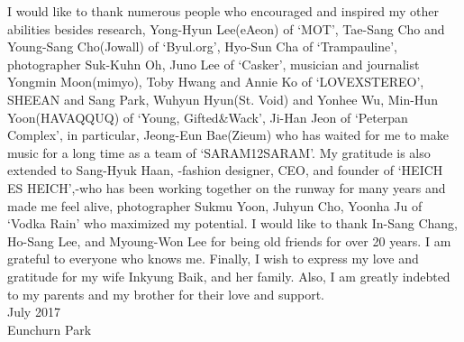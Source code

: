 I would like to thank numerous people who encouraged and inspired my other abilities besides research, Yong-Hyun Lee(eAeon) of `MOT', Tae-Sang Cho and Young-Sang Cho(Jowall) of `Byul.org', Hyo-Sun Cha of `Trampauline', photographer Suk-Kuhn Oh, Juno Lee of `Casker', musician and journalist Yongmin Moon(mimyo), Toby Hwang and Annie Ko of `LOVEXSTEREO', SHEEAN and Sang Park, Wuhyun Hyun(St. Void) and Yonhee Wu, Min-Hun Yoon(HAVAQQUQ) of `Young, Gifted\&Wack', Ji-Han Jeon of `Peterpan Complex', in particular, Jeong-Eun Bae(Zieum) who has waited for me to make music for a long time as a team of `SARAM12SARAM'. My gratitude is also extended to Sang-Hyuk Haan, -fashion designer, CEO, and founder of `HEICH ES HEICH',-who has been working together on the runway for many years and made me feel alive, photographer Sukmu Yoon, Juhyun Cho, Yoonha Ju of `Vodka Rain' who maximized my potential. I would like to thank In-Sang Chang, Ho-Sang Lee, and Myoung-Won Lee for being old friends for over 20 years. I am grateful to everyone who knows me. Finally, I wish to express my love and gratitude for my wife Inkyung Baik, and her family. Also, I am greatly indebted to my parents and my brother for their love and support.
\\
\hspace*{\fill} July 2017\\
\hspace*{\fill} Eunchurn Park